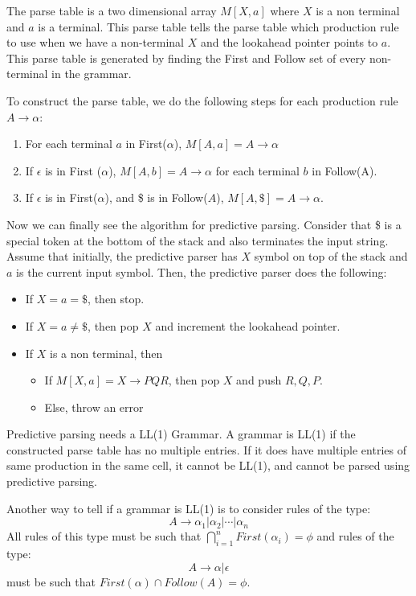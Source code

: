 \documentclass[12pt,letterpaper]{amsbook}
\theoremstyle{definition}
\begin{document}
The parse table is a two dimensional array $M[X,a]$ where $X$ is a non terminal and $a$ is a terminal. This parse table tells the parse table which production rule to use when we have a non-terminal $X$ and the lookahead pointer points to $a$. This parse table is generated by finding the First and Follow set of every non-terminal in the grammar.

To construct the parse table, we do the following steps for each production rule $A \rightarrow \alpha$:

\begin{enumerate}
  \item For each terminal $a$ in First($\alpha$), $M[A,a] = A \rightarrow \alpha$
  \item If $\epsilon$ is in First ($\alpha$), $M[A,b] = A \rightarrow \alpha$ for each terminal $b$ in Follow(A).
  \item If $\epsilon$ is in First($\alpha$), and \$ is in Follow($A$), $M[A,\$] = A \rightarrow \alpha$.
\end{enumerate}

Now we can finally see the algorithm for predictive parsing. Consider that \$ is a special token at the bottom of the stack and also terminates the input string. Assume that initially, the predictive parser has $X$ symbol on top of the stack and $a$ is the current input symbol. Then, the predictive parser does the following:

\begin{itemize}
  \item If $X=a=\$$, then stop.
  \item If $X = a \neq \$$, then pop $X$ and increment the lookahead pointer.
  \item If $X$ is a non terminal, then
    \begin{itemize}
      \item If $M[X,a] = X \rightarrow PQR$, then pop $X$ and push $R,Q,P$.
      \item Else, throw an error
    \end{itemize}
\end{itemize}

Predictive parsing needs a LL(1) Grammar. A grammar is LL(1) if the constructed parse table has no multiple entries. If it does have multiple entries of same production in the same cell, it cannot be LL(1), and cannot be parsed using predictive parsing.

Another way to tell if a grammar is LL(1) is to consider rules of the type:
\[A \rightarrow \alpha_1 | \alpha_2 | \cdots | \alpha_n\]
All rules of this type must be such that $\bigcap_{i=1}^n First(\alpha_i) = \phi$ and rules of the type:
\[A \rightarrow \alpha | \epsilon\]
must be such that $First(\alpha) \cap Follow(A) = \phi$.
\end{document}
